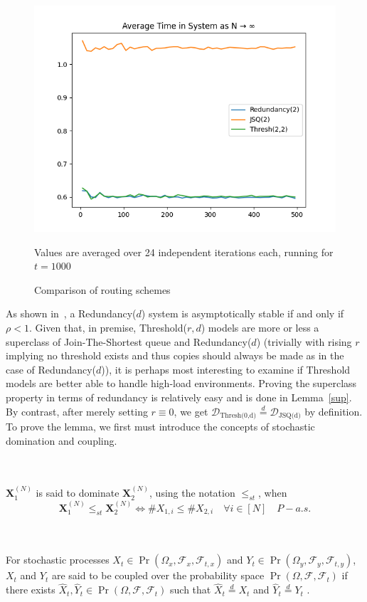 \begin{figure}
    \centering
    \includegraphics[width=0.7\linewidth]{compare_red_thr}
    \caption{Comparison of routing schemes}
    \medskip
    Values are averaged over 24 independent iterations each, running for $t=1000$
    \label{fig:img}
\end{figure}

As shown in~\cite{gardner_redundancy-d_2017}, a Redundancy($d$) system is asymptotically stable if and only if $\rho < 1 $. Given that, in premise, Threshold($r,d$) models are more or less a superclass of Join-The-Shortest queue and Redundancy($d$) (trivially with rising $r$  implying no threshold exists and thus copies should always be made as in the case of Redundancy($d$)), it is perhaps most interesting to examine if Threshold models are better able to handle high-load environments. Proving the superclass property in terms of redundancy is relatively easy and is done in Lemma~\ref{sup}. By contrast, after merely setting $r \equiv 0$, we get $ \mathcal{D}_{\text{Thresh(0,d)}} \overset{d}{=} \mathcal{D}_{\text{JSQ(d)}}$ by definition. To prove the lemma, we first must introduce the concepts of stochastic domination and coupling.
\begin{definition}
    \\~\\
    $\mathbf{X}_{1}^{(N)}$ is said to dominate $\mathbf{X}_{2}^{(N)}$, using the notation $\leq_{st}$, when
    \[\mathbf{X}_{1}^{(N)}\leq_{st}\mathbf{X}_{2}^{(N)} \iff\# X_{1,i} \leq \# X_{2,i}  \quad \forall i \in [N] \quad P-a.s.\]
\end{definition}

\begin{definition}
    \label{coupled}
    \\~\\
    For stochastic processes $X_{t} \in \Pr(\Omega_{x}, \mathcal{F}_{x}, \mathcal{F}_{t,x})$ and $Y_{t} \in \Pr(\Omega_{y}, \mathcal{F}_{y}, \mathcal{F}_{t,y})$,
    $X_{t}$ and $Y_{t}$ are said to be coupled over the probability space $\Pr(\Omega, \mathcal{F}, \mathcal{F}_{t})$ if there exists
    $\hat X_{t}, \hat Y_{t} \in \Pr(\Omega, \mathcal{F}, \mathcal{F}_{t})$ such that $\hat X_{t} \overset{d}{=}X_{t}$ and $\hat Y_{t} \overset{d}{=}Y_{t}$ \cite{bramson_asymptotic_2012}.
\end{definition}

